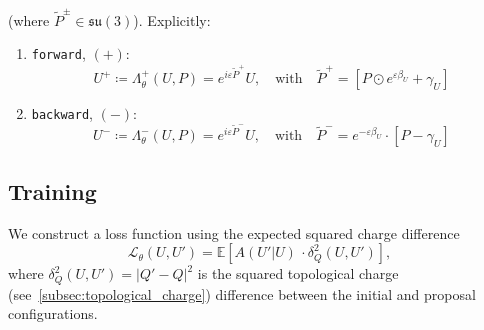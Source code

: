 \documentclass[a4paper,11pt]{article}
\begin{document}
%
(where $\tilde{P}^{\pm} \in \mathfrak{su(3)}$).
%
Explicitly:
%
\begin{enumerate}
\item \texttt{forward}, $(+)$:
    \begin{equation}
        U^{+} \coloneqq \Lambda^{+}_{\theta}(U, P) = e^{i\varepsilon \tilde{P}^{+}} U, \quad \text{with}\quad \tilde{P}^{+} = \left[P\odot e^{\varepsilon \beta_{U}} + \gamma_{U}\right]
    \end{equation}
%
\item \texttt{backward}, $(-)$:
%
    \begin{equation}
        U^{-} \coloneqq \Lambda^{-}_{\theta}(U, P) = e^{i\varepsilon \tilde{P}^{-}} U, \quad \text{with}\quad \tilde{P}^{-} = e^{-\varepsilon \beta_{U}} \cdot \left[P - \gamma_{U} \right] 
    \end{equation}
%
\end{enumerate}
%
\subsection{\label{subsec:training}Training}
%
We construct a loss function using the expected squared charge
difference
%
\begin{equation}
    \mathcal{L}_{\theta}(U, U') = \mathbb{E}\left[A(U'|U)\,\cdot \delta^{2}_{Q}(U, U')\right],
\end{equation}
%
where $\delta^{2}_{Q}(U, U')= |Q' - Q|^{2}$ is the squared topological
charge (see~\ref{subsec:topological_charge}) difference between the initial and proposal configurations.
\end{document}
